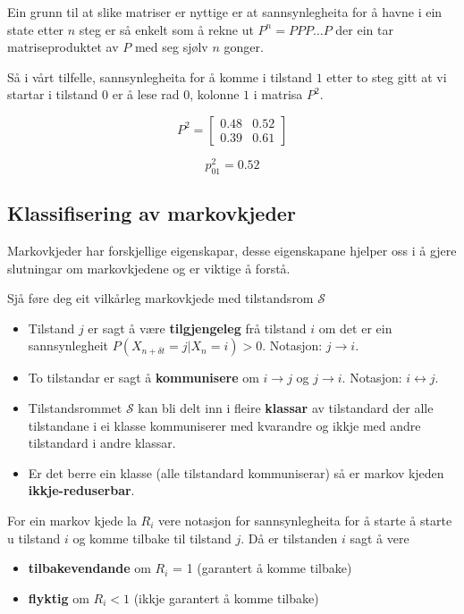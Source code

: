 Ein grunn til at slike matriser er nyttige er at sannsynlegheita for å havne i ein state etter $n$ steg er så enkelt som å rekne ut $P^n = PPP\dots P$ der ein tar matriseproduktet av $P$ med seg sjølv $n$ gonger.

Så i vårt tilfelle, sannsynlegheita for å komme i tilstand $1$ etter to steg gitt at vi startar i tilstand $0$ er å lese rad $0$, kolonne $1$ i matrisa $P^2$. 

\begin{equation}
    P^2 = 
    \begin{bmatrix}
    0.48 & 0.52 \\
    0.39 & 0.61
    \end{bmatrix}
\end{equation}

\begin{equation}
    p_{01}^2 = 0.52
\end{equation}

\subsection{Klassifisering av markovkjeder}
Markovkjeder har forskjellige eigenskapar, desse eigenskapane hjelper oss i å gjere slutningar om markovkjedene og er viktige å forstå.

Sjå føre deg eit vilkårleg markovkjede med tilstandsrom $\mathcal{S}$
\begin{itemize}
    \item Tilstand $j$ er sagt å være \textbf{tilgjengeleg} frå tilstand $i$ om det er ein sannsynlegheit $P(X_{n+\delta t} = j | X_n = i) > 0$. Notasjon: $j \rightarrow i$.
    \item To tilstandar er sagt å \textbf{kommunisere} om $i \rightarrow j$ og $j \rightarrow i$. Notasjon: $i \leftrightarrow j$.
    \item Tilstandsrommet $\mathcal{S}$ kan bli delt inn i fleire \textbf{klassar} av tilstandard der alle tilstandane i ei klasse kommuniserer med kvarandre og ikkje med andre tilstandard i andre klassar.
    \item Er det berre ein klasse (alle tilstandard kommuniserar) så er markov kjeden \textbf{ikkje-reduserbar}.
\end{itemize}

For ein markov kjede la $R_i$ vere notasjon for sannsynlegheita for å starte å starte u tilstand $i$ og komme tilbake til tilstand $j$. Då er tilstanden $i$ sagt å vere
\begin{itemize}
    \item \textbf{tilbakevendande} om $R_i$ = 1 (garantert å komme tilbake)
    \item \textbf{flyktig} om $R_i < 1$ (ikkje garantert å komme tilbake)
\end{itemize}

